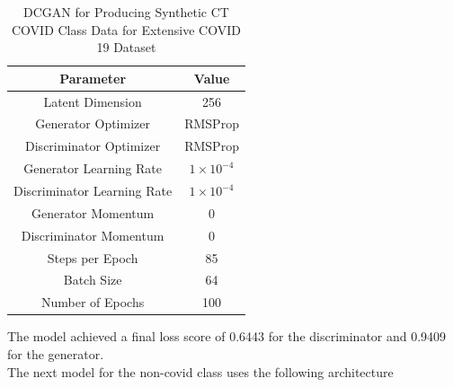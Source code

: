 \begin{table}[H]
    \centering
    \begin{tabular}{|c|c|}
    \hline
        Parameter
        & Value\\
         \hline
          Latent Dimension & 256\\
          Generator Optimizer & RMSProp \\
          Discriminator Optimizer & RMSProp\\
          Generator Learning Rate & $1\times10^{-4}$\\
          Discriminator Learning Rate & $1\times10^{-4}$\\
          Generator Momentum & 0\\
          Discriminator Momentum & 0\\
          Steps per Epoch & 85\\
          Batch Size &  64\\
          Number of Epochs & 100 \\
         \hline
    \end{tabular}
    \caption{DCGAN for Producing Synthetic CT COVID Class Data for Extensive COVID 19 Dataset}
    \label{tab:DCGAN for Producing Synthetic CT COVID Class Data for Extensive COVID 19 Dataset}
\end{table}
The model achieved a final loss score of 0.6443 for the discriminator and 0.9409 for the generator.
\\
The next model for the non-covid class uses the following architecture

